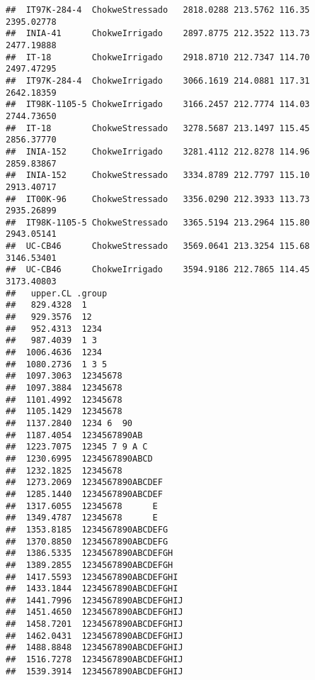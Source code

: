 \documentclass[]{book}
\theoremstyle{definition}
\theoremstyle{definition}
\theoremstyle{definition}
\theoremstyle{remark}
\begin{document}
\begin{verbatim}
##  IT97K-284-4  ChokweStressado   2818.0288 213.5762 116.35 2395.02778
##  INIA-41      ChokweIrrigado    2897.8775 212.3522 113.73 2477.19888
##  IT-18        ChokweIrrigado    2918.8710 212.7347 114.70 2497.47295
##  IT97K-284-4  ChokweIrrigado    3066.1619 214.0881 117.31 2642.18359
##  IT98K-1105-5 ChokweIrrigado    3166.2457 212.7774 114.03 2744.73650
##  IT-18        ChokweStressado   3278.5687 213.1497 115.45 2856.37770
##  INIA-152     ChokweIrrigado    3281.4112 212.8278 114.96 2859.83867
##  INIA-152     ChokweStressado   3334.8789 212.7797 115.10 2913.40717
##  IT00K-96     ChokweStressado   3356.0290 212.3933 113.73 2935.26899
##  IT98K-1105-5 ChokweStressado   3365.5194 213.2964 115.80 2943.05141
##  UC-CB46      ChokweStressado   3569.0641 213.3254 115.68 3146.53401
##  UC-CB46      ChokweIrrigado    3594.9186 212.7865 114.45 3173.40803
##   upper.CL .group                                
##   829.4328  1                                    
##   929.3576  12                                   
##   952.4313  1234                                 
##   987.4039  1 3                                  
##  1006.4636  1234                                 
##  1080.2736  1 3 5                                
##  1097.3063  12345678                             
##  1097.3884  12345678                             
##  1101.4992  12345678                             
##  1105.1429  12345678                             
##  1137.2840  1234 6  90                           
##  1187.4054  1234567890AB                         
##  1223.7075  12345 7 9 A C                        
##  1230.6995  1234567890ABCD                       
##  1232.1825  12345678                             
##  1273.2069  1234567890ABCDEF                     
##  1285.1440  1234567890ABCDEF                     
##  1317.6055  12345678      E                      
##  1349.4787  12345678      E                      
##  1353.8185  1234567890ABCDEFG                    
##  1370.8850  1234567890ABCDEFG                    
##  1386.5335  1234567890ABCDEFGH                   
##  1389.2855  1234567890ABCDEFGH                   
##  1417.5593  1234567890ABCDEFGHI                  
##  1433.1844  1234567890ABCDEFGHI                  
##  1441.7996  1234567890ABCDEFGHIJ                 
##  1451.4650  1234567890ABCDEFGHIJ                 
##  1458.7201  1234567890ABCDEFGHIJ                 
##  1462.0431  1234567890ABCDEFGHIJ                 
##  1488.8848  1234567890ABCDEFGHIJ                 
##  1516.7278  1234567890ABCDEFGHIJ                 
##  1539.3914  1234567890ABCDEFGHIJ                 

\end{verbatim}
\end{document}
